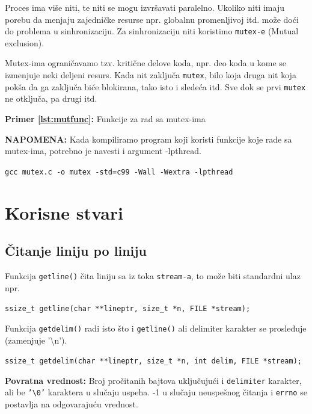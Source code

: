 \documentclass[a4paper, 11pt]{article}
\newcommand{\scode}[3] {
	\hspace{.06\textwidth} 
	\begin{minipage}[t]{.88\textwidth} %
		\begin{mdframed}[topline=true,bottomline=true,leftline=true,rightline=true,backgroundcolor=gray!22, linecolor=gray!60!black,roundcorner=1mm]
			 

	\begin{center}
		\caption{\textbf{Primer \ref{lst:#3}:} #2}
	\end{center}
	\end{mdframed}
	\end{minipage}

}
\begin{document}
Proces ima više niti, te niti se mogu izvršavati paralelno. Ukoliko niti imaju porebu da menjaju zajedničke resurse npr. globalnu promenljivoj itd. može doći do problema u sinhronizaciju. Za sinhronizaciju niti koristimo \texttt{mutex-e} (Mutual exclusion).

Mutex-ima ograničavamo tzv. kritične delove koda, npr. deo koda u kome se izmenjuje neki deljeni resurs. Kada nit zaključa \texttt{mutex}, bilo koja druga nit koja pokša da ga zaključa biće blokirana, tako isto i sledeća itd. Sve dok se prvi \texttt{mutex} ne otključa, pa drugi itd.

\vspace{2mm} 
\scode{mutex_lock.c}{Funkcije za rad sa mutex-ima}{mutfunc}

\vspace{2mm} 
 \textbf{NAPOMENA:} Kada kompiliramo program koji koristi funkcije koje rade sa mutex-ima, potrebno je navesti i argument -lpthread. 
 \vspace{2mm} 

\begin{center}
	\texttt{gcc mutex.c -o mutex -std=c99 -Wall -Wextra -lpthread} 
\end{center}

\newpage
\section{Korisne stvari}

\subsection{Čitanje liniju po liniju}

Funkcija \texttt{getline()} čita liniju sa iz toka \texttt{stream-a}, to može biti standardni ulaz npr.
\begin{center}
	\texttt{ssize\_t getline(char **lineptr, size\_t *n, FILE *stream);}
\end{center}

Funkcija \texttt{getdelim()} radi isto što i \texttt{getline()} ali delimiter karakter se prosleđuje (zamenjuje '\textbackslash n').

\begin{center}
	\texttt{ssize\_t getdelim(char **lineptr, size\_t *n, int delim, FILE *stream);}
\end{center}

\textbf{Povratna vrednost:} Broj pročitanih bajtova uključujući i \texttt{delimiter} karakter, ali be \texttt{'\textbackslash 0'} karaktera u slučaju uspeha. -1 u slučaju neuspešnog čitanja i \texttt{errno} se postavlja na odgovarajuću vrednost.
\end{document}
